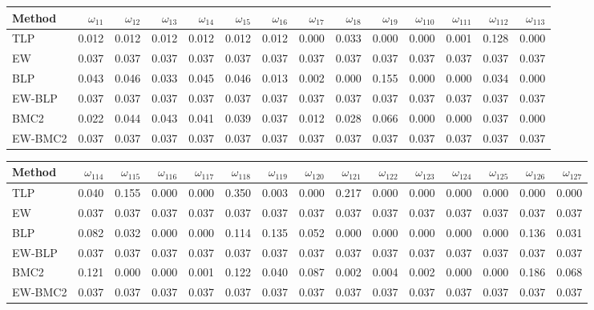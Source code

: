 \documentclass[
]{article}
\begin{document}
\begin{tabular}{lrrrrrrrrrrrrr}
\toprule
Method & $\omega_{11}$ & $\omega_{12}$ & $\omega_{13}$ & $\omega_{14}$ & $\omega_{15}$ & $\omega_{16}$ & $\omega_{17}$ & $\omega_{18}$ & $\omega_{19}$ & $\omega_{110}$ & $\omega_{111}$ & $\omega_{112}$ & $\omega_{113}$\\
\midrule
TLP & 0.012 & 0.012 & 0.012 & 0.012 & 0.012 & 0.012 & 0.000 & 0.033 & 0.000 & 0.000 & 0.001 & 0.128 & 0.000\\
EW & 0.037 & 0.037 & 0.037 & 0.037 & 0.037 & 0.037 & 0.037 & 0.037 & 0.037 & 0.037 & 0.037 & 0.037 & 0.037\\
BLP & 0.043 & 0.046 & 0.033 & 0.045 & 0.046 & 0.013 & 0.002 & 0.000 & 0.155 & 0.000 & 0.000 & 0.034 & 0.000\\
EW-BLP & 0.037 & 0.037 & 0.037 & 0.037 & 0.037 & 0.037 & 0.037 & 0.037 & 0.037 & 0.037 & 0.037 & 0.037 & 0.037\\
BMC2 & 0.022 & 0.044 & 0.043 & 0.041 & 0.039 & 0.037 & 0.012 & 0.028 & 0.066 & 0.000 & 0.000 & 0.037 & 0.000\\
EW-BMC2 & 0.037 & 0.037 & 0.037 & 0.037 & 0.037 & 0.037 & 0.037 & 0.037 & 0.037 & 0.037 & 0.037 & 0.037 & 0.037\\
\bottomrule
\end{tabular}

\begin{tabular}{lrrrrrrrrrrrrrr}
\toprule
Method & $\omega_{114}$ & $\omega_{115}$ & $\omega_{116}$ & $\omega_{117}$ & $\omega_{118}$ & $\omega_{119}$ & $\omega_{120}$ & $\omega_{121}$ & $\omega_{122}$ & $\omega_{123}$ & $\omega_{124}$ & $\omega_{125}$ & $\omega_{126}$ & $\omega_{127}$\\
\midrule
TLP & 0.040 & 0.155 & 0.000 & 0.000 & 0.350 & 0.003 & 0.000 & 0.217 & 0.000 & 0.000 & 0.000 & 0.000 & 0.000 & 0.000\\
EW & 0.037 & 0.037 & 0.037 & 0.037 & 0.037 & 0.037 & 0.037 & 0.037 & 0.037 & 0.037 & 0.037 & 0.037 & 0.037 & 0.037\\
BLP & 0.082 & 0.032 & 0.000 & 0.000 & 0.114 & 0.135 & 0.052 & 0.000 & 0.000 & 0.000 & 0.000 & 0.000 & 0.136 & 0.031\\
EW-BLP & 0.037 & 0.037 & 0.037 & 0.037 & 0.037 & 0.037 & 0.037 & 0.037 & 0.037 & 0.037 & 0.037 & 0.037 & 0.037 & 0.037\\
BMC2 & 0.121 & 0.000 & 0.000 & 0.001 & 0.122 & 0.040 & 0.087 & 0.002 & 0.004 & 0.002 & 0.000 & 0.000 & 0.186 & 0.068\\
EW-BMC2 & 0.037 & 0.037 & 0.037 & 0.037 & 0.037 & 0.037 & 0.037 & 0.037 & 0.037 & 0.037 & 0.037 & 0.037 & 0.037 & 0.037\\
\bottomrule
\end{tabular}
\end{document}
